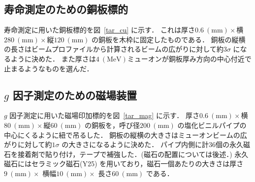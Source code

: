  



%

\subsection{寿命測定のための銅板標的}
寿命測定に用いた銅板標的を図~\ref{tar_cu} に示す．
これは厚さ$0.6~(\mathrm{mm})\times$横$280~(\mathrm{mm})\times$縦$120~(\mathrm{mm})$ の銅板を木枠に固定したものである．
銅板の縦横の長さはビームプロファイルから計算されるビームの広がりに対して約$3\sigma$ になるように決めた．
また厚さは$4~(\mathrm{MeV}) $ミューオンが銅板厚み方向の中心付近で止まるようなものを選んだ．
\subsection{$g$ 因子測定のための磁場装置}
$g$ 因子測定に用いた磁場印加標的を図~\ref{tar_mag} に示す．
厚さ$0.6~(\mathrm{mm})\times$横$80~(\mathrm{mm})\times$縦$60~(\mathrm{mm})$ の銅板を，呼び径$200~(\mathrm{mm})$ の塩化ビニルパイプの中心にくるように紐で吊るした．
銅板の縦横の大きさはミューオンビームの広がりに対して約$1\sigma$ の大きさになるように決めた．
パイプ内側に計36個の永久磁石を接着剤で貼り付け，テープで補強した．(磁石の配置については後述．)
永久磁石にはセラミック磁石(Y25) を用いており，磁石一個あたりの大きさは厚さ$9~(\mathrm{mm})\times$ 横幅$10~(\mathrm{mm})\times$ 長さ$60~(\mathrm{mm})$ である．

